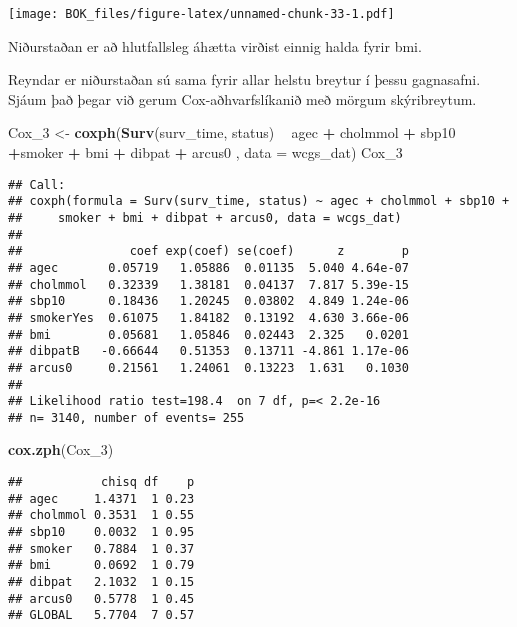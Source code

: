 \documentclass[
]{book}
\newenvironment{Shaded}{\begin{snugshade}}{\end{snugshade}}
\newcommand{\DataTypeTok}[1]{\textcolor[rgb]{0.13,0.29,0.53}{#1}}
\newcommand{\DecValTok}[1]{\textcolor[rgb]{0.00,0.00,0.81}{#1}}
\newcommand{\KeywordTok}[1]{\textcolor[rgb]{0.13,0.29,0.53}{\textbf{#1}}}
\newcommand{\NormalTok}[1]{#1}
\newcommand{\OperatorTok}[1]{\textcolor[rgb]{0.81,0.36,0.00}{\textbf{#1}}}
\newcommand{\StringTok}[1]{\textcolor[rgb]{0.31,0.60,0.02}{#1}}
\begin{document}
\texttt{[image: BOK\_files/figure-latex/unnamed-chunk-33-1.pdf]}

Niðurstaðan er að hlutfallsleg áhætta virðist einnig halda fyrir bmi.

Reyndar er niðurstaðan sú sama fyrir allar helstu breytur í þessu gagnasafni. Sjáum það þegar við gerum Cox-aðhvarfslíkanið með mörgum skýribreytum.

\begin{Shaded}
\begin{Highlighting}[]
\NormalTok{Cox_}\DecValTok{3}\NormalTok{ <-}\StringTok{ }\KeywordTok{coxph}\NormalTok{(}\KeywordTok{Surv}\NormalTok{(surv_time, status) }\OperatorTok{~}\StringTok{  }\NormalTok{agec }\OperatorTok{+}\StringTok{ }\NormalTok{cholmmol }\OperatorTok{+}\StringTok{ }\NormalTok{sbp10 }\OperatorTok{+}\NormalTok{smoker }\OperatorTok{+}\StringTok{ }\NormalTok{bmi  }\OperatorTok{+}\StringTok{ }\NormalTok{dibpat }\OperatorTok{+}\StringTok{ }\NormalTok{arcus0  , }\DataTypeTok{data =}\NormalTok{ wcgs_dat)}
\NormalTok{Cox_}\DecValTok{3}
\end{Highlighting}
\end{Shaded}

\begin{verbatim}
## Call:
## coxph(formula = Surv(surv_time, status) ~ agec + cholmmol + sbp10 + 
##     smoker + bmi + dibpat + arcus0, data = wcgs_dat)
## 
##               coef exp(coef) se(coef)      z        p
## agec       0.05719   1.05886  0.01135  5.040 4.64e-07
## cholmmol   0.32339   1.38181  0.04137  7.817 5.39e-15
## sbp10      0.18436   1.20245  0.03802  4.849 1.24e-06
## smokerYes  0.61075   1.84182  0.13192  4.630 3.66e-06
## bmi        0.05681   1.05846  0.02443  2.325   0.0201
## dibpatB   -0.66644   0.51353  0.13711 -4.861 1.17e-06
## arcus0     0.21561   1.24061  0.13223  1.631   0.1030
## 
## Likelihood ratio test=198.4  on 7 df, p=< 2.2e-16
## n= 3140, number of events= 255
\end{verbatim}

\begin{Shaded}
\begin{Highlighting}[]
\KeywordTok{cox.zph}\NormalTok{(Cox_}\DecValTok{3}\NormalTok{)}
\end{Highlighting}
\end{Shaded}

\begin{verbatim}
##           chisq df    p
## agec     1.4371  1 0.23
## cholmmol 0.3531  1 0.55
## sbp10    0.0032  1 0.95
## smoker   0.7884  1 0.37
## bmi      0.0692  1 0.79
## dibpat   2.1032  1 0.15
## arcus0   0.5778  1 0.45
## GLOBAL   5.7704  7 0.57
\end{verbatim}
\end{document}
